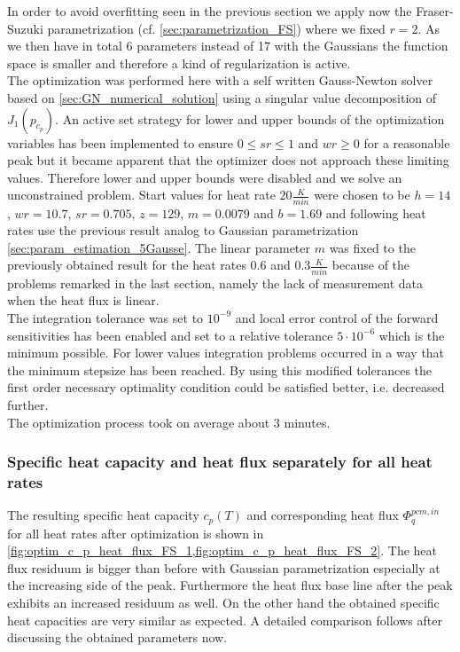\documentclass{scrartcl}[12pt, halfparskip]
\numberwithin{equation}{section}
\numberwithin{figure}{section}
\numberwithin{table}{section}
\begin{document}
In order to avoid overfitting seen in the previous section we apply now the Fraser-Suzuki parametrization (cf. \cref{sec:parametrization_FS}) where we fixed $r=2$. As we then have in total 6 parameters instead of 17 with the Gaussians the function space is smaller and therefore a kind of regularization is active. \\
The optimization was performed here with a self written Gauss-Newton solver based on \cref{sec:GN_numerical_solution} using a singular value decomposition of $J_1(p_{c_p})$. An active set strategy for lower and upper bounds of the optimization variables has been implemented to ensure $0 \le sr \le 1$ and $wr \ge 0$ for a reasonable peak but it became apparent that the optimizer does not approach these limiting values. Therefore lower and upper bounds were disabled and we solve an unconstrained problem. Start values for heat rate $20 \frac{K}{min}$ were chosen to be $h=14$, $wr=10.7$, $sr=0.705$, $z=129$, $m=0.0079$ and $b=1.69$ and following heat rates use the previous result analog to Gaussian parametrization \cref{sec:param_estimation_5Gausse}. The linear parameter $m$ was fixed to the previously obtained result for the heat rates $0.6$ and $0.3 \frac{K}{min}$ because of the problems remarked in the last section, namely the lack of measurement data when the heat flux is linear. \\
The integration tolerance was set to $10^{-9}$ and local error control of the forward sensitivities has been enabled and set to a relative tolerance $5\cdot 10^{-6}$ which is the minimum possible. For lower values integration problems occurred in a way that the minimum stepsize has been reached. By using this modified tolerances the first order necessary optimality condition could be satisfied better, i.e. decreased further. \\
The optimization process took on average about $3$ minutes.


\subsubsection{Specific heat capacity and heat flux separately for all heat rates}

The resulting specific heat capacity $c_p(T)$ and corresponding heat flux $\varPhi_q^{pcm,in}$ for all heat rates after optimization is shown in \cref{fig:optim_c_p_heat_flux_FS_1,fig:optim_c_p_heat_flux_FS_2}. The heat flux residuum is bigger than before with Gaussian parametrization especially at the increasing side of the peak. Furthermore the heat flux base line after the peak exhibits an increased residuum as well. On the other hand the obtained specific heat capacities are very similar as expected. A detailed comparison follows after discussing the obtained parameters now.
\end{document}
